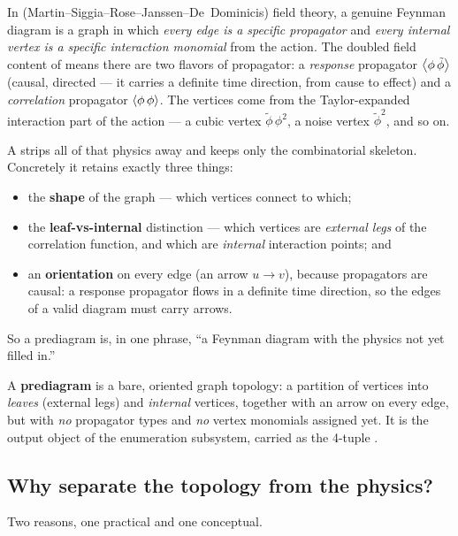 In \msrjd{} (Martin--Siggia--Rose--Janssen--De~Dominicis) field theory, a genuine
Feynman diagram is a graph in which \emph{every edge is a specific propagator}
and \emph{every internal vertex is a specific interaction monomial} from the
action. The doubled field content of \msrjd{} means there are two flavors of
propagator: a \emph{response} propagator $\left\langle \phi\,\tilde\phi \right\rangle$ (causal,
directed --- it carries a definite time direction, from cause to effect) and a
\emph{correlation} propagator $\left\langle \phi\,\phi \right\rangle$. The vertices come from the
Taylor-expanded interaction part of the action --- a cubic vertex $\tilde\phi\,
\phi^2$, a noise vertex $\tilde\phi^2$, and so on.

A  strips all of that physics away and keeps only the
combinatorial skeleton. Concretely it retains exactly three things:

\begin{itemize}
  \item the \textbf{shape} of the graph --- which vertices connect to which;
  \item the \textbf{leaf-vs-internal} distinction --- which vertices are
        \emph{external legs} of the correlation function, and which are
        \emph{internal} interaction points; and
  \item an \textbf{orientation} on every edge (an arrow $u \to v$), because
        \msrjd{} propagators are causal: a response propagator flows in a
        definite time direction, so the edges of a valid diagram must carry
        arrows.
\end{itemize}

So a prediagram is, in one phrase, ``a Feynman diagram with the physics not yet
filled in.''

\begin{defn}
A \textbf{prediagram} is a bare, oriented graph topology: a partition of vertices
into \emph{leaves} (external legs) and \emph{internal} vertices, together with an
arrow on every edge, but with \emph{no} propagator types and \emph{no} vertex
monomials assigned yet. It is the output object of the enumeration subsystem,
carried as the 4-tuple .
\end{defn}

\subsection{Why separate the topology from the physics?}

Two reasons, one practical and one conceptual.

